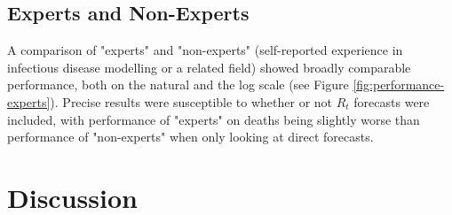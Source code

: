 \documentclass[10pt,a4paper,twocolumn]{article}
\begin{document}
\subsection*{Experts and Non-Experts}

A comparison of "experts" and "non-experts" (self-reported experience in infectious disease modelling or a related field) showed broadly comparable performance, both on the natural and the log scale (see Figure \ref{fig:performance-experts}). Precise results were susceptible to whether or not $R_t$ forecasts were included, with performance of "experts" on deaths being slightly worse than performance of "non-experts" when only looking at direct forecasts. 


\section*{Discussion}

\end{document}
